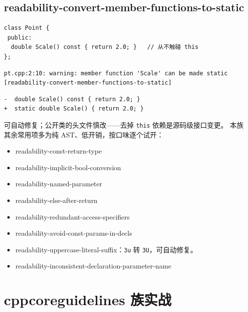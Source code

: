 \documentclass[12pt,a4paper,fontset=fandol]{ctexbook}
\newcommand{\Bk}{\discretionary{}{}{}}
\begin{document}
\subsection{readability-convert-member-functions-to-static}\label{sec:ch13-s4e}
\begin{lstlisting}[style=cppstyle]
class Point {
 public:
  double Scale() const { return 2.0; }   // 从不触碰 this
};
\end{lstlisting}
\begin{lstlisting}[style=shellstyle]
pt.cpp:2:10: warning: member function 'Scale' can be made static [readability-convert-member-functions-to-static]
\end{lstlisting}
\begin{lstlisting}[style=diffstyle]
-  double Scale() const { return 2.0; }
+  static double Scale() { return 2.0; }
\end{lstlisting}
可自动修复；公开类的头文件慎改——去掉 \texttt{this} 依赖是源码级接口变更。
本族其余常用项多为纯 AST、低开销，按口味逐个试开：
\begin{itemize}
  \item readability-{\Bk}const-{\Bk}return-{\Bk}type
  \item readability-{\Bk}implicit-{\Bk}bool-{\Bk}conversion
  \item readability-{\Bk}named-{\Bk}parameter
  \item readability-{\Bk}else-{\Bk}after-{\Bk}return
  \item readability-{\Bk}redundant-{\Bk}access-{\Bk}specifiers
  \item readability-{\Bk}avoid-{\Bk}const-{\Bk}params-{\Bk}in-{\Bk}decls
  \item readability-{\Bk}uppercase-{\Bk}literal-{\Bk}suffix：\texttt{3u} 转 \texttt{3U}，可自动修复。
  \item readability-{\Bk}inconsistent-{\Bk}declaration-{\Bk}parameter-{\Bk}name
\end{itemize}

\section{cppcoreguidelines 族实战}\label{sec:ch13-s5}
\end{document}

